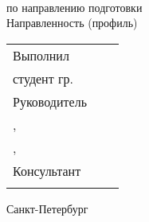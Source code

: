 \vspace{0pt plus2fill} %


{\centering%
	
	\MakeUppercase{\bfseries{}\DocType} \\ 
	\MakeUppercase{\thesisDegree}%


\intervalS%
{\centering%
	\MakeUppercase{\bfseries{\thesisTitle}}}%

}\par%

\intervalS%
\noindent	по направлению подготовки \thesisSpecialtyCodeAndTitle{}\\%
\noindent	Направленность (профиль)	\thesisOPCodeAndTitle %
\par%





\vspace{4mm plus2fill}%

\noindent
\begin{tabularx}{\linewidth}{lXl}
	Выполнил              &	   &             \\
	студент гр.~\group     &    & \Author     \\[\mfloatsep]

	Руководитель 		  &    &             \\
	\SupervisorJob,		  &    &             \\
	\SupervisorDegree, \SupervisorTitle 	  &    & \Supervisor \\[\mfloatsep]
	
	Консультант		  &    & 			 \\
	\ConsultantExtraDegree 	  &    & \ConsultantExtra\\[\mfloatsep]
	
\end{tabularx} %


%
\vspace{0pt plus4fill}%


\begin{center}%
Санкт-Петербург\\
\thesisYear
\end{center}%
\restoregeometry
\newpage